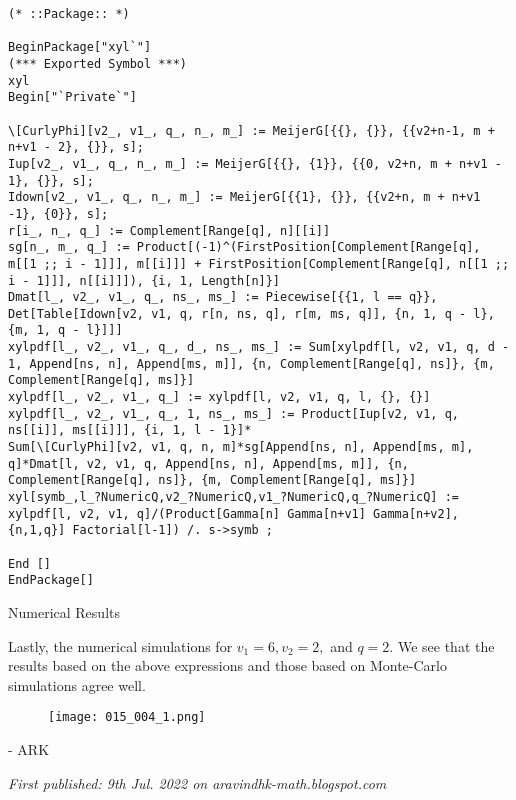 \begin{verbatim}
(* ::Package:: *)

BeginPackage["xyl`"]
(*** Exported Symbol ***)
xyl
Begin["`Private`"]

\[CurlyPhi][v2_, v1_, q_, n_, m_] := MeijerG[{{}, {}}, {{v2+n-1, m + n+v1 - 2}, {}}, s]; 
Iup[v2_, v1_, q_, n_, m_] := MeijerG[{{}, {1}}, {{0, v2+n, m + n+v1 - 1}, {}}, s]; 
Idown[v2_, v1_, q_, n_, m_] := MeijerG[{{1}, {}}, {{v2+n, m + n+v1 -1}, {0}}, s]; 
r[i_, n_, q_] := Complement[Range[q], n][[i]]
sg[n_, m_, q_] := Product[(-1)^(FirstPosition[Complement[Range[q], m[[1 ;; i - 1]]], m[[i]]] + FirstPosition[Complement[Range[q], n[[1 ;; i - 1]]], n[[i]]]), {i, 1, Length[n]}]
Dmat[l_, v2_, v1_, q_, ns_, ms_] := Piecewise[{{1, l == q}}, Det[Table[Idown[v2, v1, q, r[n, ns, q], r[m, ms, q]], {n, 1, q - l}, {m, 1, q - l}]]]
xylpdf[l_, v2_, v1_, q_, d_, ns_, ms_] := Sum[xylpdf[l, v2, v1, q, d - 1, Append[ns, n], Append[ms, m]], {n, Complement[Range[q], ns]}, {m, Complement[Range[q], ms]}]
xylpdf[l_, v2_, v1_, q_] := xylpdf[l, v2, v1, q, l, {}, {}]
xylpdf[l_, v2_, v1_, q_, 1, ns_, ms_] := Product[Iup[v2, v1, q, ns[[i]], ms[[i]]], {i, 1, l - 1}]*
Sum[\[CurlyPhi][v2, v1, q, n, m]*sg[Append[ns, n], Append[ms, m], q]*Dmat[l, v2, v1, q, Append[ns, n], Append[ms, m]], {n, Complement[Range[q], ns]}, {m, Complement[Range[q], ms]}]
xyl[symb_,l_?NumericQ,v2_?NumericQ,v1_?NumericQ,q_?NumericQ] := xylpdf[l, v2, v1, q]/(Product[Gamma[n] Gamma[n+v1] Gamma[n+v2],{n,1,q}] Factorial[l-1]) /. s->symb ;

End []
EndPackage[]
\end{verbatim}

Numerical Results

Lastly, the numerical simulations for $v_1 = 6, v_2 = 2,$ and $q = 2.$ We see that the results based on the above expressions and those based on Monte-Carlo simulations agree well.

\begin{figure}[H]
	\centering
	\texttt{[image: 015\_004\_1.png]}
\end{figure}

- ARK

\emph{First published: 9th Jul. 2022 on aravindhk-math.blogspot.com}
